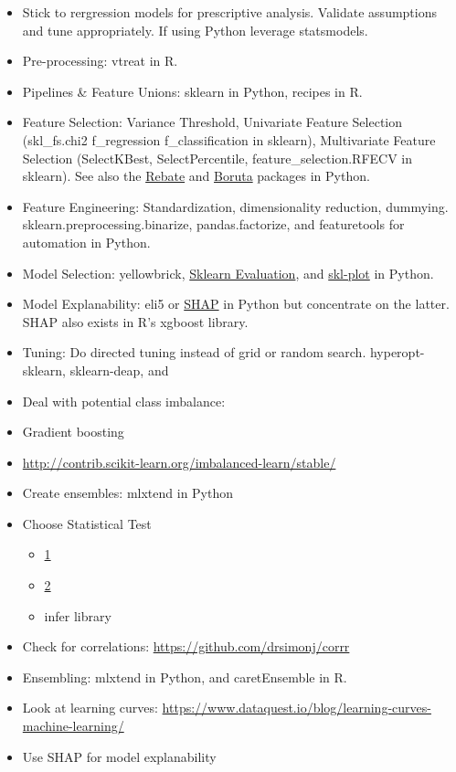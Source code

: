 \documentclass[]{book}
\providecommand{\tightlist}{%
  \setlength{\itemsep}{0pt}\setlength{\parskip}{0pt}}
\theoremstyle{definition}
\theoremstyle{definition}
\theoremstyle{definition}
\theoremstyle{remark}
\begin{document}
\begin{itemize}
\item
  Stick to rergression models for prescriptive analysis. Validate
  assumptions and tune appropriately. If using Python leverage
  statsmodels.
\item
  Pre-processing: vtreat in R.
\item
  Pipelines \& Feature Unions: sklearn in Python, recipes in R.
\item
  Feature Selection: Variance Threshold, Univariate Feature Selection
  (skl\_fs.chi2 \textbar{} f\_regression \textbar{} f\_classification in
  sklearn), Multivariate Feature Selection (SelectKBest,
  SelectPercentile, feature\_selection.RFECV in sklearn). See also the
  \href{https://github.com/EpistasisLab/scikit-rebate}{Rebate} and
  \href{https://github.com/scikit-learn-contrib/boruta_py}{Boruta}
  packages in Python.
\item
  Feature Engineering: Standardization, dimensionality reduction,
  dummying. sklearn.preprocessing.binarize, pandas.factorize, and
  featuretools for automation in Python.
\item
  Model Selection: yellowbrick,
  \href{https://edublancas.github.io/sklearn-evaluation/}{Sklearn
  Evaluation}, and
  \href{https://github.com/reiinakano/scikit-plot}{skl-plot} in Python.
\item
  Model Explanability: eli5 or
  \href{https://github.com/slundberg/shap}{SHAP} in Python but
  concentrate on the latter. SHAP also exists in R's xgboost library.
\item
  Tuning: Do directed tuning instead of grid or random search.
  hyperopt-sklearn, sklearn-deap, and
\item
  Deal with potential class imbalance:
\item
  Gradient boosting
\item
  \url{http://contrib.scikit-learn.org/imbalanced-learn/stable/}
\item
  Create ensembles: mlxtend in Python
\item
  Choose Statistical Test

  \begin{itemize}
  \tightlist
  \item
    \href{http://www.ats.ucla.edu/stat/mult_pkg/whatstat/}{1}
  \item
    \href{http://www.qnamarkup.org/i/?source=http://colarusso.github.io/QnAMarkup/examples/source/WhatStats.txt}{2}
  \item
    infer library
  \end{itemize}
\item
  Check for correlations: \url{https://github.com/drsimonj/corrr}
\item
  Ensembling: mlxtend in Python, and caretEnsemble in R.
\item
  Look at learning curves:
  \url{https://www.dataquest.io/blog/learning-curves-machine-learning/}
\item
  Use SHAP for model explanability
\end{itemize}
\end{document}
